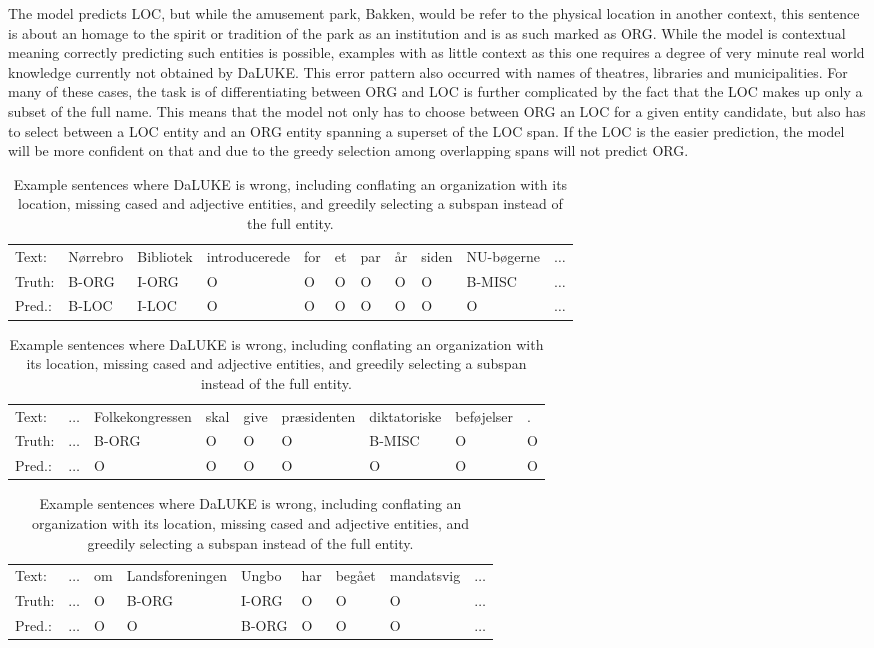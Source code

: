 \documentclass[main.tex]{subfiles}
\begin{document}
The model predicts LOC, but while the amusement park, Bakken, would be refer to the physical location in another context, this sentence is about an homage to the spirit or tradition of the park as an institution and is as such marked as ORG.
While the model is contextual meaning correctly predicting such entities is possible, examples with as little context as this one requires a degree of very minute real world knowledge currently not obtained by DaLUKE.
This error pattern also occurred with names of theatres, libraries and municipalities.
For many of these cases, the task is of differentiating between ORG and LOC is further complicated by the fact that the LOC makes up only a subset of the full name.
This means that the model not only has to choose between ORG an LOC for a given entity candidate, but also has to select between a LOC entity and an ORG entity spanning a superset of the LOC span.
If the LOC is the easier prediction, the model will be more confident on that and due to the greedy selection among overlapping spans will not predict ORG.
\begin{table}[H]
    \footnotesize
    \begin{tabular}{l|llllllllll}
        Text:   & Nørrebro  & Bibliotek  & introducerede  &for  &et  &par  &år  &siden  &NU-bøgerne & $\ldots$ \\
        Truth:  & B-ORG     & I-ORG      & O              &O    &O   &O    &O   &O      &B-MISC  & $\ldots$    \\
        Pred.:   & B-LOC     & I-LOC      & O              &O    &O   &O    &O   &O      &O   & $\ldots$\\\hline
    \end{tabular}\par
    \begin{tabular}{l|llllllll}
        Text:    & $\ldots$  &Folkekongressen  &skal  &give  &præsidenten  &diktatoriske  &beføjelser  &.\\
        Truth:   & $\ldots$  &B-ORG            &O     &O     &O            &B-MISC        &O           &O\\
        Pred.:   & $\ldots$  &O                &O     &O     &O            &O             &O           &O\\\hline
    \end{tabular}\par
    \begin{tabular}{l|llllllll}
        Text:    & $\ldots$ &  om  &Landsforeningen  &Ungbo  &har  &begået  &mandatsvig  & $\ldots$ \\
        Truth:   & $\ldots$ &  O   &B-ORG            &I-ORG  &O    &O       &O           & $\ldots$ \\
        Pred.:   & $\ldots$ &  O   &O                &B-ORG  &O    &O       &O           & $\ldots$
    \end{tabular}
    \caption{
        Example sentences where DaLUKE is wrong, including conflating an organization with its location, missing cased and adjective entities, and greedily selecting a subspan instead of the full entity.
    }
    \label{tab:dalukeerrors}
\end{table}\noindent
\end{document}
